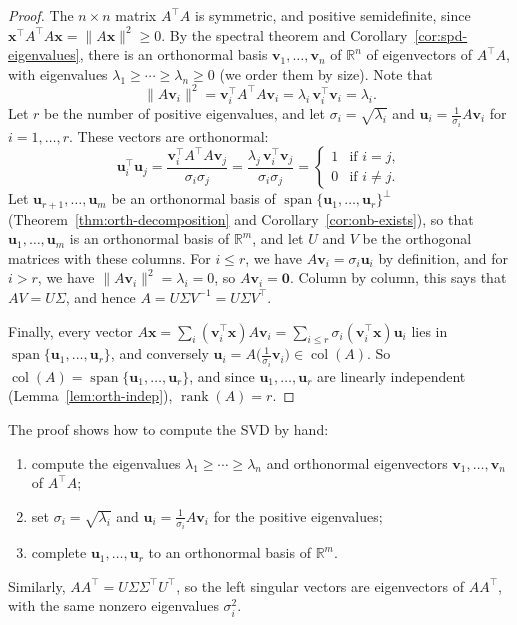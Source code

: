 \documentclass[11pt]{article}
\newcommand{\norm}[1]{\lVert #1 \rVert}
\theoremstyle{definition}
\theoremstyle{plain}
\theoremstyle{remark}
\DeclareMathOperator{\rank}{rank}
\DeclareMathOperator{\col}{col}
\DeclareMathOperator{\Span}{span}
\begin{document}
\begin{proof}
    The $n \times n$ matrix $A^\top A$ is symmetric, and positive semidefinite, since $\mathbf{x}^\top A^\top A \mathbf{x} = \norm{A\mathbf{x}}^2 \geq 0$. By the spectral theorem and Corollary~\ref{cor:spd-eigenvalues}, there is an orthonormal basis $\mathbf{v}_1, \ldots, \mathbf{v}_n$ of $\mathbb{R}^n$ of eigenvectors of $A^\top A$, with eigenvalues $\lambda_1 \geq \cdots \geq \lambda_n \geq 0$ (we order them by size). Note that
    \[\norm{A\mathbf{v}_i}^2 = \mathbf{v}_i^\top A^\top A \mathbf{v}_i = \lambda_i \, \mathbf{v}_i^\top \mathbf{v}_i = \lambda_i.\]
    Let $r$ be the number of positive eigenvalues, and let $\sigma_i = \sqrt{\lambda_i}$ and $\mathbf{u}_i = \frac{1}{\sigma_i} A \mathbf{v}_i$ for $i = 1, \ldots, r$. These vectors are orthonormal:
    \[\mathbf{u}_i^\top \mathbf{u}_j = \frac{\mathbf{v}_i^\top A^\top A \mathbf{v}_j}{\sigma_i \sigma_j} = \frac{\lambda_j\, \mathbf{v}_i^\top \mathbf{v}_j}{\sigma_i \sigma_j} = \begin{cases} 1 & \text{if } i = j, \\ 0 & \text{if } i \neq j. \end{cases}\]
    Let $\mathbf{u}_{r+1}, \ldots, \mathbf{u}_m$ be an orthonormal basis of $\Span\{\mathbf{u}_1, \ldots, \mathbf{u}_r\}^\perp$ (Theorem~\ref{thm:orth-decomposition} and Corollary~\ref{cor:onb-exists}), so that $\mathbf{u}_1, \ldots, \mathbf{u}_m$ is an orthonormal basis of $\mathbb{R}^m$, and let $U$ and $V$ be the orthogonal matrices with these columns. For $i \leq r$, we have $A\mathbf{v}_i = \sigma_i \mathbf{u}_i$ by definition, and for $i > r$, we have $\norm{A\mathbf{v}_i}^2 = \lambda_i = 0$, so $A\mathbf{v}_i = \mathbf{0}$. Column by column, this says that $AV = U\Sigma$, and hence $A = U\Sigma V^{-1} = U\Sigma V^\top$.

    Finally, every vector $A\mathbf{x} = \sum_i (\mathbf{v}_i^\top \mathbf{x}) A\mathbf{v}_i = \sum_{i \leq r} \sigma_i (\mathbf{v}_i^\top \mathbf{x}) \mathbf{u}_i$ lies in $\Span\{\mathbf{u}_1, \ldots, \mathbf{u}_r\}$, and conversely $\mathbf{u}_i = A\big(\frac{1}{\sigma_i} \mathbf{v}_i\big) \in \col(A)$. So $\col(A) = \Span\{\mathbf{u}_1, \ldots, \mathbf{u}_r\}$, and since $\mathbf{u}_1, \ldots, \mathbf{u}_r$ are linearly independent (Lemma~\ref{lem:orth-indep}), $\rank(A) = r$.
\end{proof}

The proof shows how to compute the SVD by hand:
\begin{enumerate}
    \item compute the eigenvalues $\lambda_1 \geq \cdots \geq \lambda_n$ and orthonormal eigenvectors $\mathbf{v}_1, \ldots, \mathbf{v}_n$ of $A^\top A$;
    \item set $\sigma_i = \sqrt{\lambda_i}$ and $\mathbf{u}_i = \frac{1}{\sigma_i} A \mathbf{v}_i$ for the positive eigenvalues;
    \item complete $\mathbf{u}_1, \ldots, \mathbf{u}_r$ to an orthonormal basis of $\mathbb{R}^m$.
\end{enumerate}
Similarly, $AA^\top = U \Sigma\Sigma^\top U^\top$, so the left singular vectors are eigenvectors of $AA^\top$, with the same nonzero eigenvalues $\sigma_i^2$.
\end{document}
